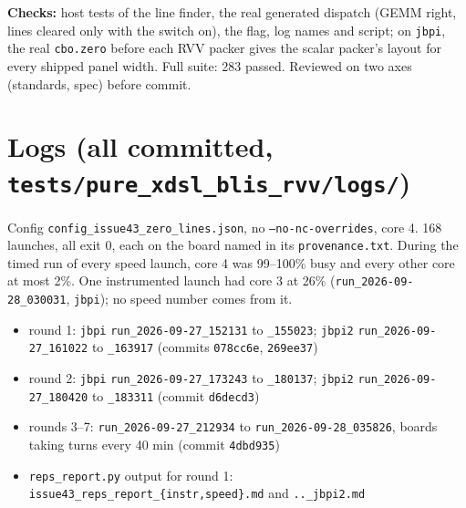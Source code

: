 \documentclass[10pt,a4paper]{article}
\begin{document}
\textbf{Checks:} host tests of the line finder, the real generated dispatch (GEMM right, lines cleared only with the
switch on), the flag, log names and script; on \texttt{jbpi}, the real \texttt{cbo.zero} before each RVV packer gives
the scalar packer's layout for every shipped panel width. Full suite: 283 passed. Reviewed on two axes (standards,
spec) before commit.

\appendix
\section{Logs (all committed, \texttt{tests/pure\_xdsl\_blis\_rvv/logs/})}
Config \texttt{config\_issue43\_zero\_lines.json}, no \texttt{--no-nc-overrides}, core 4. 168 launches, all exit 0, each on
the board named in its \texttt{provenance.txt}. During the timed run of every speed launch, core 4 was 99--100\%
busy and every other core at most 2\%. One instrumented launch had core 3 at 26\% (\texttt{run\_2026-09-28\_030031},
\texttt{jbpi}); no speed number comes from it.
\begin{itemize}
  \item round 1: \texttt{jbpi} \texttt{run\_2026-09-27\_152131} to \texttt{\_155023}; \texttt{jbpi2}
  \texttt{run\_2026-09-27\_161022} to \texttt{\_163917} (commits \texttt{078cc6e}, \texttt{269ee37})
  \item round 2: \texttt{jbpi} \texttt{run\_2026-09-27\_173243} to \texttt{\_180137}; \texttt{jbpi2}
  \texttt{run\_2026-09-27\_180420} to \texttt{\_183311} (commit \texttt{d6decd3})
  \item rounds 3--7: \texttt{run\_2026-09-27\_212934} to \texttt{run\_2026-09-28\_035826}, boards taking turns every
  40 min (commit \texttt{4dbd935})
  \item \texttt{reps\_report.py} output for round 1: \texttt{issue43\_reps\_report\_\{instr,speed\}.md} and
  \texttt{..\_jbpi2.md}
\end{itemize}
\end{document}

